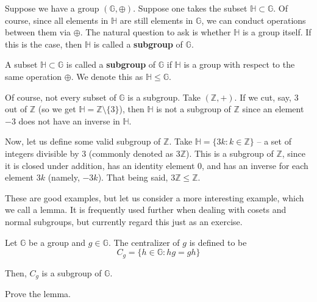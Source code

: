 \documentclass[../lecture-notes.tex]{subfiles}
\begin{document}
Suppose we have a group $(\mathbb{G},\oplus)$. Suppose one takes the subset $\mathbb{H} \subset \mathbb{G}$. Of course, since all elements in $\mathbb{H}$ are still elements in $\mathbb{G}$, we can conduct operations between them via $\oplus$. 
The natural question to ask is whether $\mathbb{H}$ is a group itself. If this 
is the case, then $\mathbb{H}$ is called a \textbf{subgroup} of $\mathbb{G}$.

\begin{definition}
    A subset $\mathbb{H} \subset \mathbb{G}$ is called a \textbf{subgroup} of $\mathbb{G}$ if $\mathbb{H}$ is a group with respect to the same operation $\oplus$. We denote this as $\mathbb{H} \leq \mathbb{G}$.
\end{definition}

\begin{example}
    Of course, not every subset of $\mathbb{G}$ is a subgroup. Take $(\mathbb{Z}, +)$. If we cut, say, $3$ out of $\mathbb{Z}$ (so we get $\mathbb{H} = \mathbb{Z} \setminus \{3\}$), then $\mathbb{H}$ is not a subgroup of $\mathbb{Z}$ since an element $-3$ does not have an inverse in $\mathbb{H}$.
\end{example}

\begin{example}
    Now, let us define some valid subgroup of $\mathbb{Z}$. Take $\mathbb{H} = \{3k: k \in \mathbb{Z}\}$ -- a set of integers divisible by $3$ (commonly denoted as $3\mathbb{Z}$). This is a subgroup of $\mathbb{Z}$, since it is closed under addition, has an identity element $0$, and has an inverse for each element $3k$ (namely, $-3k$). That being said, $3\mathbb{Z} \leq \mathbb{Z}$.
\end{example}

These are good examples, but let us consider a more interesting example, which we call a lemma. It is frequently used further when dealing with cosets and normal subgroups, but currently regard this just as an exercise.
\begin{lemma}
    Let $\mathbb{G}$ be a group and $g \in \mathbb{G}$. The centralizer of $g$ is defined to be
    \begin{equation}
        C_g = \{h \in \mathbb{G}: h g = g h\}
    \end{equation}

    Then, $C_g$ is a subgroup of $\mathbb{G}$.
\end{lemma}

\begin{exercise}
    Prove the lemma.
\end{exercise}
\end{document}
